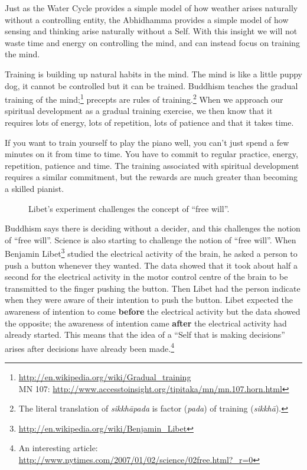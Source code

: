 Just as the Water Cycle provides a simple model of how weather arises naturally without a controlling entity, the Abhidhamma provides a simple model of how sensing and thinking arise naturally without a Self. With this insight we will not waste time and energy on controlling the mind, and can instead focus on training the mind.

Training is building up natural habits in the mind. The mind is like a little puppy dog, it cannot be controlled but it can be trained. Buddhism teaches the gradual training of the mind;\footnote{\url{http://en.wikipedia.org/wiki/Gradual_training}\\MN 107: \url{http://www.accesstoinsight.org/tipitaka/mn/mn.107.horn.html}} precepts are rules of training.\footnote{The literal translation of \textit{sikkhāpada} is factor (\textit{pada}) of training (\textit{sikkhā}).} When we approach our spiritual development as a gradual training exercise, we then know that it requires lots of energy, lots of repetition, lots of patience and that it takes time. 

If you want to train yourself to play the piano well, you can’t just spend a few minutes on it from time to time. You have to commit to regular practice, energy, repetition, patience and time. The training associated with spiritual development requires a similar commitment, but the rewards are much greater than becoming a skilled pianist.

\begin{figure}[H]
\centering

\caption{Libet’s experiment challenges the concept of “free will”.}
\label{fig:Libet}
\end{figure}

Buddhism says there is deciding without a decider, and this challenges the notion of “free will”. Science is also starting to challenge the notion of “free will”. When Benjamin Libet\footnote{\url{http://en.wikipedia.org/wiki/Benjamin_Libet}} studied the electrical activity of the brain, he asked a person to push a button whenever they wanted. The data showed that it took about half a second for the electrical activity in the motor control centre of the brain to be transmitted to the finger pushing the button. Then Libet had the person indicate when they were aware of their intention to push the button. Libet expected the awareness of intention to come \textbf{before} the electrical activity but the data showed the opposite; the awareness of intention came \textbf{after} the electrical activity had already started. This means that the idea of a “Self that is making decisions” arises after decisions have already been made.\footnote{An interesting article: \url{http://www.nytimes.com/2007/01/02/science/02free.html?_r=0}}

